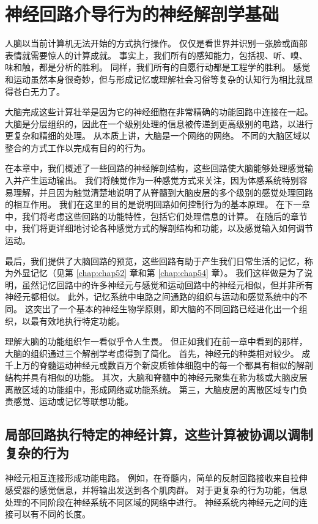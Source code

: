 \chapter{神经回路介导行为的神经解剖学基础} \label{chap:chap4}

人脑以当前计算机无法开始的方式执行操作。 
仅仅是看世界并识别一张脸或面部表情就需要惊人的计算成就。
事实上，我们所有的感知能力，包括视、听、嗅、味和触，都是分析的胜利。
同样，我们所有的自愿行动都是工程学的胜利。 
感觉和运动虽然本身很奇妙，但与形成记忆或理解社会习俗等复杂的认知行为相比就显得苍白无力了。


大脑完成这些计算壮举是因为它的神经细胞在非常精确的功能回路中连接在一起。
大脑是分层组织的，因此在一个级别处理的信息被传递到更高级别的电路，以进行更复杂和精细的处理。 
从本质上讲，大脑是一个网络的网络。 
不同的大脑区域以整合的方式工作以完成有目的的行为。


在本章中，我们概述了一些回路的神经解剖结构，这些回路使大脑能够处理感觉输入并产生运动输出。
我们将触觉作为一种感觉方式来关注，因为体感系统特别容易理解，并且因为触觉清楚地说明了从脊髓到大脑皮层的多个级别的感觉处理回路的相互作用。
我们在这里的目的是说明回路如何控制行为的基本原理。 
在下一章中，我们将考虑这些回路的功能特性，包括它们处理信息的计算。 
在随后的章节中，我们将更详细地讨论各种感觉方式的解剖结构和功能，以及感觉输入如何调节运动。


最后，我们提供了大脑回路的预览，这些回路有助于产生我们日常生活的记忆，称为外显记忆（见第 \ref{chap:chap52} 章和第 \ref{chap:chap54} 章）。 
我们这样做是为了说明，虽然记忆回路中的许多神经元与感觉和运动回路中的神经元相似，但并非所有神经元都相似。 
此外，记忆系统中电路之间通路的组织与运动和感觉系统中的不同。 
这突出了一个基本的神经生物学原则，即大脑的不同回路已经进化出一个组织，以最有效地执行特定功能。


理解大脑的功能组织乍一看似乎令人生畏。 
但正如我们在前一章中看到的那样，大脑的组织通过三个解剖学考虑得到了简化。 
首先，神经元的种类相对较少。 
成千上万的脊髓运动神经元或数百万个新皮质锥体细胞中的每一个都具有相似的解剖结构并具有相似的功能。 
其次，大脑和脊髓中的神经元聚集在称为核或大脑皮层离散区域的功能组中，形成网络或功能系统。 
第三，大脑皮层的离散区域专门负责感觉、运动或记忆等联想功能。


\section{局部回路执行特定的神经计算，这些计算被协调以调制复杂的行为}

神经元相互连接形成功能电路。 
例如，在脊髓内，简单的反射回路接收来自拉伸感受器的感觉信息，并将输出发送到各个肌肉群。 
对于更复杂的行为功能，信息处理的不同阶段在神经系统不同区域的网络中进行。 
神经系统内神经元之间的连接可以有不同的长度。


